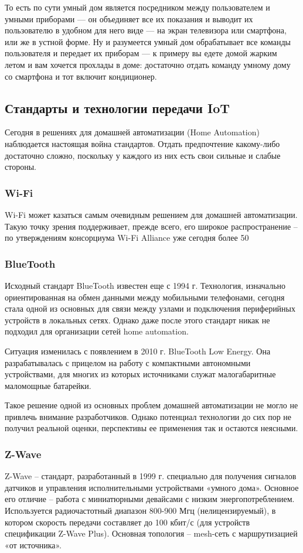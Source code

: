 \documentclass[a4paper,14pt]{extarticle}
\begin{document}
То есть по сути умный дом является посредником между пользователем и умными приборами --- он объединяет все их показания и выводит их пользователю в удобном для него виде --- на экран телевизора или смартфона, или же в устной форме. Ну и разумеется умный дом обрабатывает все команды пользователя и передает их приборам --- к примеру вы едете домой жарким летом и вам хочется прохлады в доме: достаточно отдать команду умному дому со смартфона и тот включит кондиционер.
\subsection {Стандарты и технологии передачи IoT}

Сегодня в решениях для домашней автоматизации (Home Automation) наблюдается настоящая война стандартов. Отдать предпочтение какому-либо достаточно сложно, поскольку у каждого из них есть свои сильные и слабые стороны.
\subsubsection*{Wi-Fi}
Wi-Fi может казаться самым очевидным решением для домашней автоматизации. Такую точку зрения поддерживает, прежде всего, его широкое распространение – по утверждениям консорциума Wi-Fi Alliance уже сегодня более 50%
\subsubsection*{BlueTooth}
Исходный стандарт BlueTooth известен еще с 1994 г. Технология, изначально ориентированная на обмен данными между мобильными телефонами, сегодня стала одной из основных для связи между узлами и подключения периферийных устройств в локальных сетях. Однако даже после этого стандарт никак не подходил для организации сетей home automation.

Ситуация изменилась с появлением в 2010 г. BlueTooth Low Energy. Она разрабатывалась с прицелом на работу с компактными автономными устройствами, для многих из которых источниками служат малогабаритные маломощные батарейки.

Такое решение одной из основных проблем домашней автоматизации не могло не привлечь внимание разработчиков. Однако потенциал технологии до сих пор не получил реальной оценки, перспективы ее применения так и остаются неясными.
\subsubsection*{Z-Wave}
Z-Wave – стандарт, разработанный в 1999 г. специально для получения сигналов датчиков и управления исполнительными устройствами «умного дома». Основное его отличие – работа с миниатюрными девайсами с низким энергопотреблением. Используется радиочастотный диапазон 800-900 Мгц (нелицензируемый), в котором скорость передачи составляет до 100 кбит/с (для устройств спецификации Z-Wave Plus). Основная топология – mesh-сеть с маршрутизацией «от источника».
\end{document}

